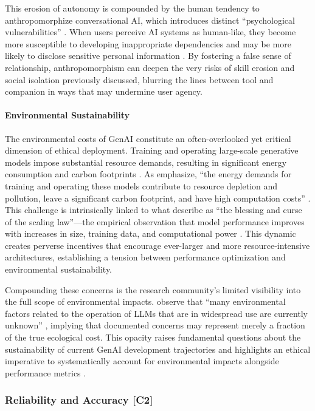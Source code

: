 This erosion of autonomy is compounded by the human tendency to anthropomorphize conversational AI, which introduces distinct ``psychological vulnerabilities'' \parencite{S09}. When users perceive AI systems as human-like, they become more susceptible to developing inappropriate dependencies and may be more likely to disclose sensitive personal information \parencite{S09}. By fostering a false sense of relationship, anthropomorphism can deepen the very risks of skill erosion and social isolation previously discussed, blurring the lines between tool and companion in ways that may undermine user agency.

\paragraph{Environmental Sustainability}
The environmental costs of GenAI constitute an often-overlooked yet critical dimension of ethical deployment. Training and operating large-scale generative models impose substantial resource demands, resulting in significant energy consumption and carbon footprints \parencite{R01, R04, S07, S10, R10, S15}. As \citeauthor{S09} emphasize, \enquote{the energy demands for training and operating these models contribute to resource depletion and pollution, leave a significant carbon footprint, and have high computation costs} \parencite*{S09}. This challenge is intrinsically linked to what \citeauthor{R02} describe as \enquote{the blessing and curse of the scaling law}—the empirical observation that model performance improves with increases in size, training data, and computational power \parencite*{R02}. This dynamic creates perverse incentives that encourage ever-larger and more resource-intensive architectures, establishing a tension between performance optimization and environmental sustainability.

Compounding these concerns is the research community's limited visibility into the full scope of environmental impacts. \citeauthor{S09} observe that \enquote{many environmental factors related to the operation of LLMs that are in widespread use are currently unknown} \parencite*{S09}, implying that documented concerns may represent merely a fraction of the true ecological cost. This opacity raises fundamental questions about the sustainability of current GenAI development trajectories and highlights an ethical imperative to systematically account for environmental impacts alongside performance metrics \parencite{S15}.

\subsubsection{Reliability and Accuracy [C2]}

